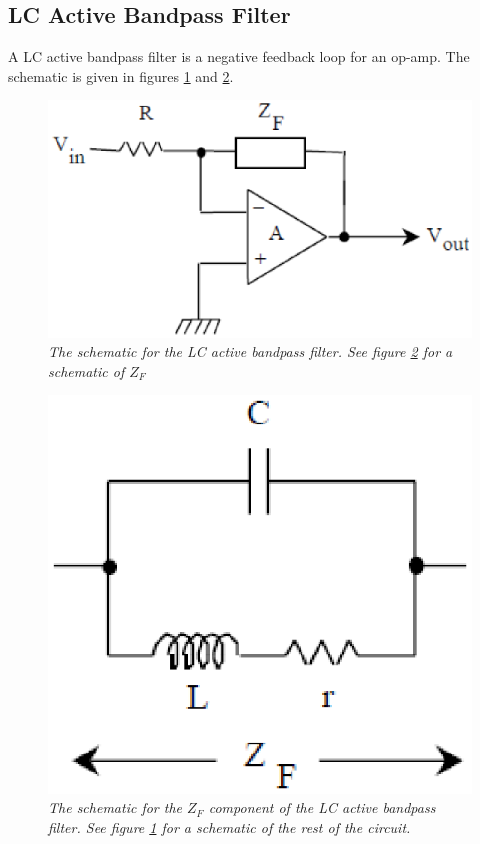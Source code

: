 \documentclass[11pt]{article}
\numberwithin{equation}{section}
\numberwithin{figure}{section}
\numberwithin{table}{section}
\begin{document}
\subsection{LC Active Bandpass Filter}
A LC active bandpass filter is a negative feedback loop for an op-amp. The schematic is given in figures \ref{FigLCbandSchem1} and \ref{FigLCbandSchem2}.
\begin{figure}[h]
\centering
\includegraphics[scale=0.60]{FigLCbandSchem1}
\caption{\textit{The schematic for the LC active bandpass filter. See figure \ref{FigLCbandSchem2} for a schematic of $Z_F$}}
\label{FigLCbandSchem1}
\end{figure}
\begin{figure}[h]
\centering
\includegraphics[scale=0.60]{FigLCbandSchem2}
\caption{\textit{The schematic for the $Z_F$ component of the LC active bandpass filter. See figure \ref{FigLCbandSchem1} for a schematic of the rest of the circuit.}}
\label{FigLCbandSchem2}
\end{figure}
\end{document}
